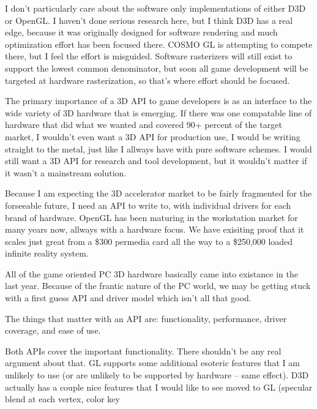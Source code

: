 \begin{allintypewriter}
\par
I don't particularly care about the software only implementations of either D3D or OpenGL. 
I haven't done serious research here, but I think D3D has a real edge, because it was 
originally designed for software rendering and much optimization effort has been focused 
there. COSMO GL is attempting to compete there, but I feel the effort is misguided. 
Software rasterizers will still exist to support the lowest common denominator, but soon 
all game development will be targeted at hardware rasterization, so that's where effort 
should be focused.\\ 
\par
The primary importance of a 3D API to game developers is as an interface to the wide 
variety of 3D hardware that is emerging. If there was one compatable line of hardware 
that did what we wanted and covered 90+ percent of the target market, I wouldn't even 
want a 3D API for production use, I would be writing straight to the metal, just like 
I allways have with pure software schemes. I would still want a 3D API for research and 
tool development, but it wouldn't matter if it wasn't a mainstream solution.\\ 
\par
Because I am expecting the 3D accelerator market to be fairly fragmented for the 
forseeable future, I need an API to write to, with individual drivers for each brand of 
hardware. OpenGL has been maturing in the workstation market for many years now, allways 
with a hardware focus. We have exisiting proof that it scales just great from a \$300 
permedia card all the way to a \$250,000 loaded infinite reality system.\\ 
\par
All of the game oriented PC 3D hardware basically came into existance in the last year. 
Because of the frantic nature of the PC world, we may be getting stuck with a first guess 
API and driver model which isn't all that good.\\ 
\par
The things that matter with an API are: functionality, performance, driver coverage, and
ease of use.\\ 
\par
Both APIs cover the important functionality. There shouldn't be any real argument about 
that. GL supports some additional esoteric features that I am unlikely to use (or are 
unlikely to be supported by hardware -- same effect). D3D actually has a couple nice 
features that I would like to see moved to GL (specular blend at each vertex, color key 

\end{allintypewriter}
